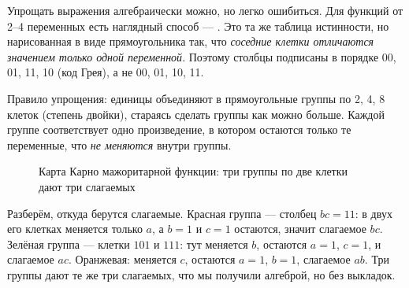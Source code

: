 Упрощать выражения алгебраически можно, но легко ошибиться. Для функций от
2--4 переменных есть наглядный способ --- . Это та же
таблица истинности, но нарисованная в виде прямоугольника так, что
\emph{соседние клетки отличаются значением только одной переменной}.
Поэтому столбцы подписаны в порядке 00, 01, 11, 10 (код Грея), а не
00, 01, 10, 11.

Правило упрощения: единицы объединяют в прямоугольные группы по 2, 4, 8
клеток (степень двойки), стараясь сделать группы как можно больше. Каждой
группе соответствует одно произведение, в котором остаются только те
переменные, что \emph{не меняются} внутри группы.

\begin{figure}[H]
\centering
{}
\caption{Карта Карно мажоритарной функции: три группы по две клетки дают
три слагаемых}
\label{fig:karnaugh}
\end{figure}

Разберём, откуда берутся слагаемые. Красная группа --- столбец $bc=11$: в
двух его клетках меняется только $a$, а $b=1$ и $c=1$ остаются, значит
слагаемое $bc$. Зелёная группа --- клетки $101$ и $111$: тут меняется $b$,
остаются $a=1$, $c=1$, и слагаемое $ac$. Оранжевая: меняется $c$, остаются
$a=1$, $b=1$, слагаемое $ab$. Три группы дают те же три слагаемых, что мы
получили алгеброй, но без выкладок.


